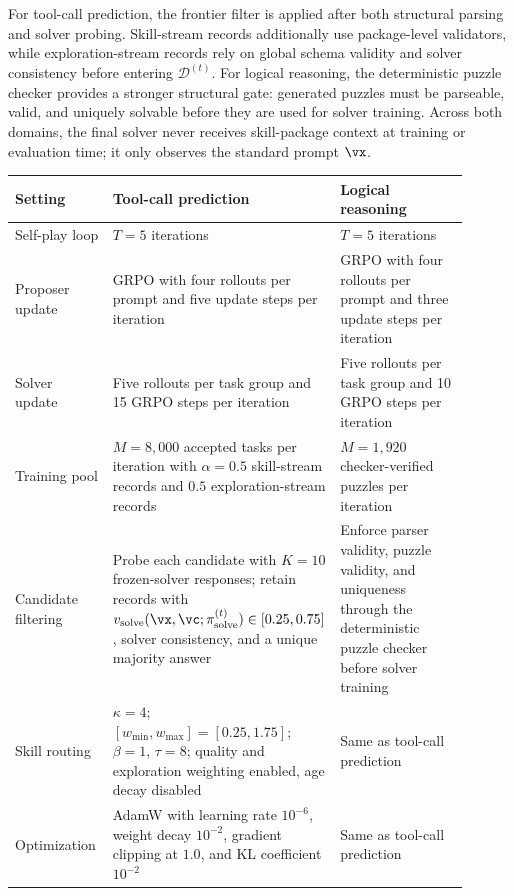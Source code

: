 For tool-call prediction, the frontier filter is applied after both structural parsing and solver probing.
Skill-stream records additionally use package-level validators, while exploration-stream records rely on global schema validity and solver consistency before entering $\mathcal{D}^{(t)}$.
For logical reasoning, the deterministic puzzle checker provides a stronger structural gate: generated puzzles must be parseable, valid, and uniquely solvable before they are used for solver training.
Across both domains, the final solver never receives skill-package context at training or evaluation time; it only observes the standard prompt $\vx$.


\begin{table}[htbp]
    \centering
    \small
    \begin{tabular}{p{0.22\linewidth} p{0.34\linewidth} p{0.34\linewidth}}
        \toprule
        \textbf{Setting} & \textbf{Tool-call prediction} & \textbf{Logical reasoning} \\
        \midrule
        Self-play loop & $T=5$ iterations & $T=5$ iterations \\
        \addlinespace
        Proposer update & GRPO with four rollouts per prompt and five update steps per iteration & GRPO with four rollouts per prompt and three update steps per iteration \\
        \addlinespace
        Solver update & Five rollouts per task group and 15 GRPO steps per iteration & Five rollouts per task group and 10 GRPO steps per iteration \\
        \addlinespace
        Training pool & $M=8{,}000$ accepted tasks per iteration with $\alpha=0.5$ skill-stream records and $0.5$ exploration-stream records & $M=1{,}920$ checker-verified puzzles per iteration \\
        \addlinespace
        Candidate filtering & Probe each candidate with $K=10$ frozen-solver responses; retain records with $v_\text{solve}(\vx,\vc;\pi_\text{solve}^{(t)})\in[0.25,0.75]$, solver consistency, and a unique majority answer & Enforce parser validity, puzzle validity, and uniqueness through the deterministic puzzle checker before solver training \\
        \addlinespace
        Skill routing & $\kappa=4$; $[w_{\min},w_{\max}]=[0.25,1.75]$; $\beta=1$, $\tau=8$; quality and exploration weighting enabled, age decay disabled & Same as tool-call prediction \\
        \addlinespace
        Optimization & AdamW with learning rate $10^{-6}$, weight decay $10^{-2}$, gradient clipping at $1.0$, and KL coefficient $10^{-2}$ & Same as tool-call prediction \\

\end{tabular}
\end{table}
